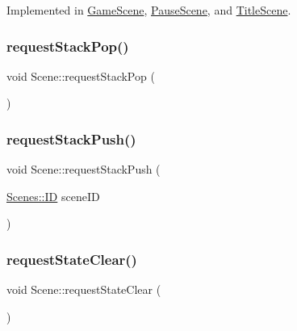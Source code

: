 Implemented in \hyperlink{class_game_scene_aa494372b1f451f3c3a268558fddb30f2}{Game\+Scene}, \hyperlink{class_pause_scene_adeb06e37e0a2afa297ddbe795c3cbe94}{Pause\+Scene}, and \hyperlink{class_title_scene_a1f019a83309ce967883b4b4d76b816af}{Title\+Scene}.

\hypertarget{class_scene_ad2f2093a8adc09c11e89cda6f94a3dd1}{}\label{class_scene_ad2f2093a8adc09c11e89cda6f94a3dd1} 
\subsubsection{\texorpdfstring{request\+Stack\+Pop()}{requestStackPop()}}
{\footnotesize\ttfamily void Scene\+::request\+Stack\+Pop (\begin{DoxyParamCaption}{ }\end{DoxyParamCaption})\hspace{0.3cm}{\ttfamily [protected]}}

\hypertarget{class_scene_a38d36125a421eab649188edb740d1c36}{}\label{class_scene_a38d36125a421eab649188edb740d1c36} 
\subsubsection{\texorpdfstring{request\+Stack\+Push()}{requestStackPush()}}
{\footnotesize\ttfamily void Scene\+::request\+Stack\+Push (\begin{DoxyParamCaption}\item[{\hyperlink{namespace_scenes_a0ad7ab6856b1d77d498e3a251f6bb275}{Scenes\+::\+ID}}]{scene\+ID }\end{DoxyParamCaption})\hspace{0.3cm}{\ttfamily [protected]}}

\hypertarget{class_scene_a0cc91a92f27ba281b52c58168b7a000a}{}\label{class_scene_a0cc91a92f27ba281b52c58168b7a000a} 
\subsubsection{\texorpdfstring{request\+State\+Clear()}{requestStateClear()}}
{\footnotesize\ttfamily void Scene\+::request\+State\+Clear (\begin{DoxyParamCaption}{ }\end{DoxyParamCaption})\hspace{0.3cm}{\ttfamily [protected]}}

